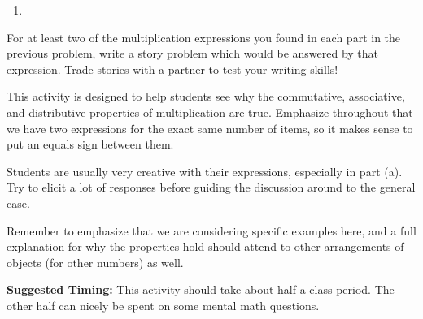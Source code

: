 \documentclass{ximera}
\begin{document}
\begin{problem}
\begin{enumerate}
{\begin{tabular}{p{0.5cm}p{0.5cm}p{0.5cm}p{0.5cm}p{0.5cm}p{0.5cm}p{0.5cm}p{0.5cm}p{0.5cm}p{0.5cm}p{0.5cm}}
        \end{tabular} }
    \item \leavevmode\vadjust{\vspace{-\baselineskip}}
\end{enumerate}
\end{problem}

\begin{problem}
 For at least two of the multiplication expressions you found in each part in the previous problem, write a story problem which would be answered by that expression.  Trade stories with a partner to test your writing skills!
\end{problem}

\newpage
\begin{instructorNotes}
This activity is designed to help students see why the commutative, associative, and distributive properties of multiplication are true.  Emphasize throughout that we have two expressions for the exact same number of items, so it makes sense to put an equals sign between them.  

Students are usually very creative with their expressions, especially in part (a).  Try to elicit a lot of responses before guiding the discussion around to the general case.  

Remember to emphasize that we are considering specific examples here, and a full explanation for why the properties hold should attend to other arrangements of objects (for other numbers) as well.

{\bf Suggested Timing:} This activity should take about half a class period.  The other half can nicely be spent on some mental math questions.
\end{instructorNotes}



\end{document}
